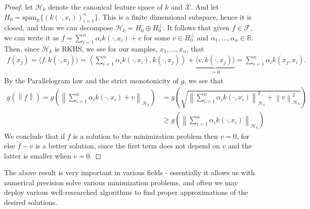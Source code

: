 \documentclass[10pt,twoside,openany,final]{memoir}
\theoremstyle{definition}
\theoremstyle{Break}
\newcommand{\lv}{\left\lVert}
\newcommand{\rv}{\right\rVert}
\newcommand{\R}{\mathbb{R}}
\newcommand{\F}{\mathcal{F}}
\renewcommand{\H}{\mathcal{H}}
\begin{document}
\begin{proof}
	let $\H_k$ denote the canonical feature space of $k$ and $\mathcal{X}$. And let $H_0 = \mathrm{span}_\R\{(k(\cdot, x_i))_{i=1}^n\}$. This is a finite dimensional subspace, hence it is closed, and thus we can decompose $\H_k = H_0 \oplus H_0^\perp$. It follows that given $f \in \F$, we can write it as $f = \sum_{i = 1}^n \alpha_i k(\cdot,x_i) + v$ for some $v \in H_0^\perp$ and $\alpha_1,\dots,\alpha_n \in \R$. Then, since $\H_k$ is RKHS, we see for our samples, $x_1,\dots,x_n$, that
\begin{align*}
	f(x_j) = \langle f , k(\cdot,x_j)\rangle = \left\langle \sum_{i=1}^n \alpha_i k(\cdot,x_i), k(\cdot,x_j)\right\rangle +\underbrace{\langle v,k(\cdot,x_j)\rangle}_{=0} = \sum_{i=1}^n \alpha_i k(x_j,x_i).
\end{align*}
By the Parallelogram law and the strict monotonicity of $g$, we see that
\begin{align*}
	g(\lv f \rv) = g\left(\lv \sum_{i=1}^n \alpha_i k(\cdot,x_i) + v \rv_{\H_k}\right) &= g\left( \sqrt{\lv \sum_{i=1}^n \alpha_i k(\cdot,x_i) \rv_{\H_k} ^2 + \lv v \rv_{\H_k}^2}\right)\\
	&\geq g\left( \lv \sum_{i=1}^n \alpha_i k(\cdot, x_i) \rv_{\H_k} \right)
\end{align*}
We conclude that if $f$ is a solution to the minimization problem then $v=0$, for else $f-v$ is a better solution, since the first term does not depend on $v$ and the latter is smaller when $v=0$.
\end{proof}
The above result is very important in various fields - essentially it allows us with numerical precision solve various minimization problems, and often we may deploy various well-researched algorithms to find proper approximations of the desired solutions. 
\end{document}
